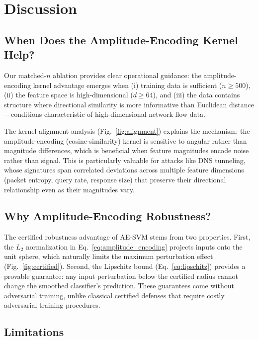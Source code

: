 \documentclass[twocolumn,a4paper,11pt]{article}
\begin{document}
\section{Discussion}
\label{sec:discussion}

\subsection{When Does the Amplitude-Encoding Kernel Help?}

Our matched-$n$ ablation provides clear operational guidance: the amplitude-encoding kernel
advantage emerges when (i) training data is sufficient ($n \geq 500$),
(ii) the feature space is high-dimensional ($d \geq 64$), and
(iii) the data contains structure where directional similarity is more informative
than Euclidean distance---conditions characteristic of high-dimensional network
flow data.

The kernel alignment analysis (Fig.~\ref{fig:alignment}) explains the mechanism:
the amplitude-encoding (cosine-similarity) kernel is sensitive to angular rather
than magnitude differences, which is beneficial when feature magnitudes encode
noise rather than signal. This is particularly valuable for attacks like DNS
tunneling, whose signatures span correlated deviations across multiple feature
dimensions (packet entropy, query rate, response size) that preserve their
directional relationship even as their magnitudes vary.

\subsection{Why Amplitude-Encoding Robustness?}

The certified robustness advantage of AE-SVM stems from two properties. First,
the $L_2$ normalization in Eq.~\ref{eq:amplitude_encoding} projects inputs onto
the unit sphere, which naturally limits the maximum perturbation effect
(Fig.~\ref{fig:certified}). Second, the Lipschitz bound (Eq.~\ref{eq:lipschitz})
provides a provable guarantee: any input perturbation below the certified radius
cannot change the smoothed classifier's prediction. These guarantees come without
adversarial training, unlike classical certified defenses that require costly
adversarial training procedures.

\subsection{Limitations}
\end{document}
